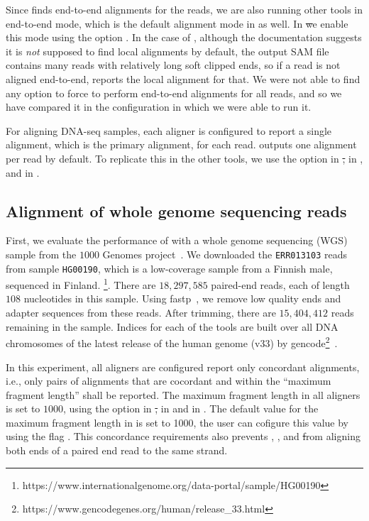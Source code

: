Since \puffaligner finds end-to-end alignments for the reads, we are also running other tools in end-to-end 
mode, which is the default alignment mode in \bt as well. In \st we enable this mode using the option 
. In the case of \debga, although the documentation suggests it is \emph{not} 
supposed to find local alignments by default, the output SAM file contains many reads with relatively long 
soft clipped ends, so if a read is not aligned end-to-end, \debga reports the local alignment for that.
We were not able to find any option to force \debga to perform end-to-end alignments for all reads, and 
so we have compared it in the configuration in which we were able to run it.

For aligning DNA-seq samples, each aligner is configured to report a single alignment, which is the primary 
alignment, for each read. \bt outputs one alignment per read by default. To replicate this in the other tools, 
we use the option  in \st,  in \debga, and  
in \puffaligner.

\subsection{Alignment of whole genome sequencing reads}

First, we evaluate the performance of \puffaligner with a whole genome sequencing (WGS) sample from 
the $1000$ Genomes project~\citep{10002015global}. We downloaded the \texttt{ERR013103} reads from sample 
\texttt{HG00190}, which is a low-coverage sample from a Finnish male, sequenced in Finland.
\footnote{https://www.internationalgenome.org/data-portal/sample/HG00190}. 
There are $18,297,585$ paired-end reads, each of length $108$ nucleotides in this sample. 
Using fastp~\citep{chen2018fastp}, we remove low quality ends and adapter sequences from these reads. 
After trimming, there are $15,404,412$ reads remaining in the sample. Indices for each of the tools 
are built over all DNA chromosomes of the latest release of the human genome (v33) by 
gencode\footnote{https://www.gencodegenes.org/human/release\_33.html}~\citep{frankish2019gencode}.

In this experiment, all aligners are configured report only concordant alignments, i.e., only pairs of 
alignments that are cocordant and within the ``maximum fragment length'' shall be reported. The maximum 
fragment length in all aligners is set to $1000$, using the option  in \st, 
 in \bt and  in \debga. The default value for the maximum fragment 
length in \puffaligner is set to 1000, the user can cofigure this value by using the flag 
. This concordance requirements also prevents \bt, \puffaligner, and \st from 
aligning both ends of a paired end read to the same strand.

